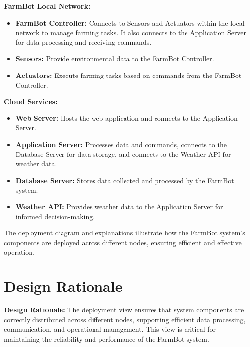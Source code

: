 \textbf{FarmBot Local Network:}
\begin{itemize}
    \item \textbf{FarmBot Controller:} Connects to Sensors and Actuators within the local network to manage farming tasks. It also connects to the Application Server for data processing and receiving commands.
    \item \textbf{Sensors:} Provide environmental data to the FarmBot Controller.
    \item \textbf{Actuators:} Execute farming tasks based on commands from the FarmBot Controller.
\end{itemize}

\textbf{Cloud Services:}
\begin{itemize}
    \item \textbf{Web Server:} Hosts the web application and connects to the Application Server.
    \item \textbf{Application Server:} Processes data and commands, connects to the Database Server for data storage, and connects to the Weather API for weather data.
    \item \textbf{Database Server:} Stores data collected and processed by the FarmBot system.
    \item \textbf{Weather API:} Provides weather data to the Application Server for informed decision-making.
\end{itemize}

The deployment diagram and explanations illustrate how the FarmBot system's components are deployed across different nodes, ensuring efficient and effective operation.

\section{Design Rationale}

\textbf{Design Rationale:} The deployment view ensures that system components are correctly distributed across different nodes, supporting efficient data processing, communication, and operational management. This view is critical for maintaining the reliability and performance of the FarmBot system.






